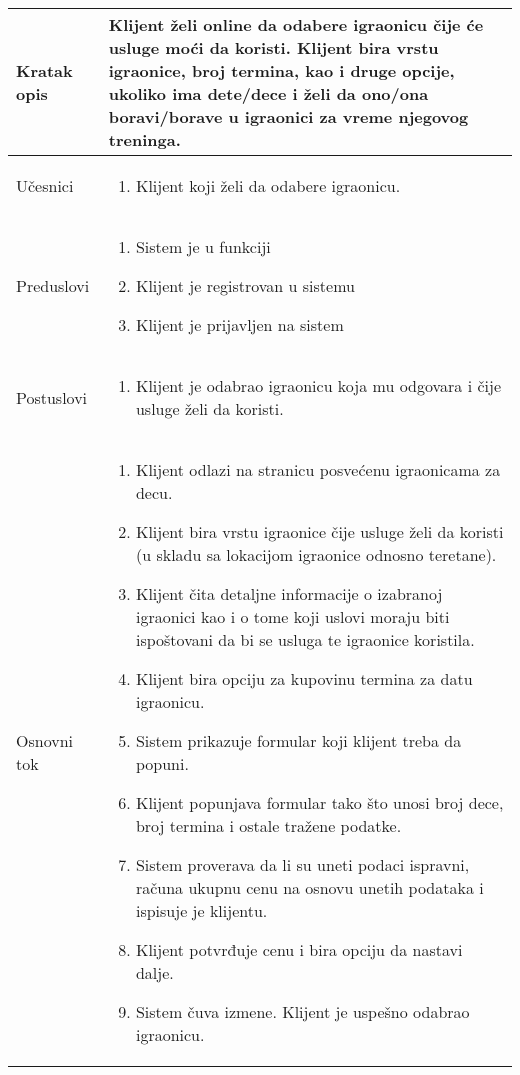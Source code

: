 \documentclass[../../main.tex]{subfiles}
\begin{document}
\begin{longtable}{| p{} | p{} |} 
\hline
    Kratak opis & Klijent želi online da odabere igraonicu čije će usluge moći da koristi. Klijent bira vrstu igraonice, broj termina, kao i druge opcije, ukoliko ima dete/dece i želi da ono/ona boravi/borave u igraonici za vreme njegovog treninga.  \\ 
\hline    
    Učesnici &
    \begin{enumerate}
        \item Klijent koji želi da odabere igraonicu.
    \end{enumerate}\\
\hline
   Preduslovi &
   \begin{enumerate}
        \item Sistem je u funkciji
        \item Klijent je registrovan u sistemu
        \item Klijent je prijavljen na sistem
    \end{enumerate}\\
\hline  
    Postuslovi & 
    \begin{enumerate}
        \item Klijent je odabrao igraonicu koja mu odgovara i čije usluge želi da koristi.
    \end{enumerate} \\
\hline
    Osnovni tok & 
    \begin{enumerate}
        \item Klijent odlazi na stranicu posvećenu igraonicama za decu.
        \item Klijent bira vrstu igraonice čije usluge želi da koristi (u skladu sa lokacijom igraonice odnosno teretane).
        \item Klijent čita detaljne informacije o izabranoj igraonici kao i o tome koji uslovi moraju biti ispoštovani da bi se usluga te igraonice koristila.
        \item Klijent bira opciju za kupovinu termina za datu igraonicu.
        \item Sistem prikazuje formular koji klijent treba da popuni.
        \item Klijent popunjava formular tako što unosi broj dece, broj termina i ostale tražene podatke.
        \item Sistem proverava da li su uneti podaci ispravni, računa ukupnu cenu na osnovu unetih podataka i ispisuje je klijentu.
        \item Klijent potvrđuje cenu i bira opciju da nastavi dalje. 
        \item Sistem čuva izmene. Klijent je uspešno odabrao igraonicu. %
        

\end{enumerate}
\end{longtable}
\end{document}
